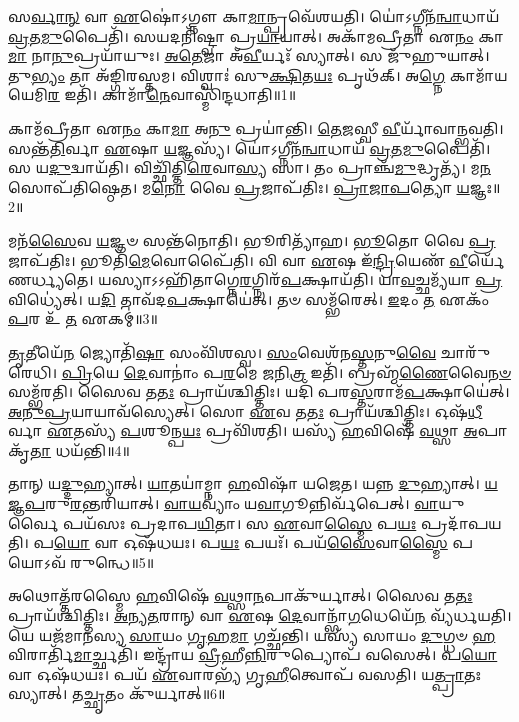 \setcounter{anuvakam}{0}

𑌸\-\ul{𑌰𑍍𑌵𑌾}\-\-\ul{𑌨𑍍} 𑌵𑌾 \ul{𑌏}\-𑌷𑍋॑\-𑌽𑌗𑍍𑌨𑍗 𑌕𑌾\-\ul{𑌮𑌾}\-𑌨𑍍𑌪𑍍𑌰𑌵𑍇᳴𑌶𑌯𑌤𑌿।
𑌯𑍋॑𑌽𑌗𑍍𑌨𑍀𑌨᳴\-\ul{𑌨𑍍𑌵𑌾}\-𑌧𑌾𑌯᳴ \ul{𑌵𑍍𑌰}\-𑌤\-\ul{𑌮𑍁}\-𑌪𑍈𑌤𑌿᳴।
𑌸𑌯𑌦𑌨𑌿᳴𑌷𑍍𑌟𑍍𑌵𑌾 𑌪𑍍𑌰\-\ul{𑌯𑌾}\-𑌯𑌾𑌤𑍍।
𑌅𑌕𑌾᳴𑌮𑌪𑍍𑌰𑍀𑌤𑌾 𑌏\-\ul{𑌨𑌂} 𑌕𑌾\-\ul{𑌮𑌾} 𑌨𑌾\-\ul{𑌨𑍁}\-𑌪𑍍𑌰𑌯𑌾᳴𑌯𑍁𑌃।
\-\ul{𑌅}\-\-\ul{𑌤𑍇}\-𑌜𑌾 𑌅᳴\-\ul{𑌵𑍀}\-𑌰𑍍𑌯𑌃᳴ 𑌸𑍍𑌯𑌾𑌤𑍍।
𑌸 𑌜𑍁᳴𑌹𑍁𑌯𑌾𑌤𑍍।
𑌤𑍁\-\ul{𑌭𑍍𑌯𑌂} 𑌤𑌾 𑌅᳴𑌙𑍍𑌗𑌿𑌰𑌸𑍍𑌤𑌮।
𑌵𑌿𑌶𑍍𑌵𑌾𑌃॑ 𑌸𑍁\-\ul{𑌕𑍍𑌷𑌿}\-𑌤\-\ul{𑌯𑌃} 𑌪𑍃𑌥᳴𑌕𑍍।
𑌅\-\ul{𑌗𑍍𑌨𑍇} 𑌕𑌾𑌮𑌾᳴𑌯 𑌯𑍇𑌮𑌿\-\ul{𑌰} 𑌇𑌤𑌿᳴।
𑌕𑌾𑌮𑌾᳴\-\ul{𑌨𑍇}\-𑌵𑌾𑌸𑍍𑌮𑌿᳴𑌨𑍍𑌦𑌧𑌾𑌤𑌿॥1॥

𑌕𑌾𑌮᳴𑌪𑍍𑌰𑍀𑌤𑌾 𑌏\-\ul{𑌨𑌂} 𑌕𑌾\-\ul{𑌮𑌾} 𑌅\-\ul{𑌨𑍁} 𑌪𑍍𑌰𑌯𑌾॑𑌨𑍍𑌤𑌿।
\-\ul{𑌤𑍇}\-\-\ul{𑌜}\-𑌸𑍍𑌵𑍀 \ul{𑌵𑍀}\-𑌰𑍍𑌯𑌾᳴𑌵𑌾𑌨𑍍𑌭𑌵𑌤𑌿।
𑌸𑌨𑍍𑌤᳴\-\ul{𑌤𑌿}\-𑌰𑍍𑌵𑌾 \ul{𑌏}\-𑌷𑌾 \ul{𑌯}\-𑌜𑍍𑌞𑌸𑍍𑌯᳴।
𑌯𑍋॑𑌽𑌗𑍍𑌨𑍀𑌨᳴\-\ul{𑌨𑍍𑌵𑌾}\-𑌧𑌾𑌯᳴ \ul{𑌵𑍍𑌰}\-𑌤\-\ul{𑌮𑍁}\-𑌪𑍈𑌤𑌿᳴।
𑌸 𑌯\-\ul{𑌦𑍁}\-𑌦𑍍𑌵𑌾𑌯᳴𑌤𑌿।
𑌵𑌿𑌚𑍍𑌛𑌿᳴𑌤𑍍𑌤𑌿\-\ul{𑌰𑍇}\-𑌵𑌾\-\ul{𑌸𑍍𑌯} 𑌸𑌾।
𑌤𑌂 𑌪𑍍𑌰𑌾𑌞𑍍𑌚᳴\-\ul{𑌮𑍁}\-𑌦𑍍𑌧𑍃𑌤𑍍𑌯᳴।
𑌮\-\ul{𑌨}\-𑌸𑍋𑌪᳴𑌤𑌿𑌷𑍍𑌠𑍇𑌤।
𑌮\-\ul{𑌨𑍋} 𑌵𑍈 \ul{𑌪𑍍𑌰}\-𑌜𑌾\-𑌪᳴𑌤𑌿𑌃।
\-\ul{𑌪𑍍𑌰𑌾}\-\-\ul{𑌜𑌾}\-\-\ul{𑌪}\-𑌤𑍍𑌯𑍋 \ul{𑌯}\-𑌜𑍍𑌞𑌃॥2॥

𑌮𑌨᳴\-\ul{𑌸𑍈}\-𑌵 \ul{𑌯}\-𑌜𑍍𑌞𑍞 𑌸𑌨𑍍𑌤᳴𑌨𑍋𑌤𑌿।
𑌭𑍂𑌰𑌿𑌤𑍍𑌯𑌾᳴𑌹।
\-\ul{𑌭𑍂}\-𑌤𑍋 𑌵𑍈 \ul{𑌪𑍍𑌰}\-𑌜𑌾\-𑌪᳴𑌤𑌿𑌃।
𑌭𑍂𑌤𑌿᳴\-\ul{𑌮𑍇}\-𑌵𑍋𑌪𑍈᳴𑌤𑌿।
𑌵𑌿 𑌵𑌾 \ul{𑌏}\-𑌷 𑌇᳴\-\ul{𑌨𑍍𑌦𑍍𑌰𑌿}\-𑌯𑍇𑌣᳴ \ul{𑌵𑍀}\-𑌰𑍍𑌯𑍇᳴𑌣𑌰𑍍𑌧𑍍𑌯𑌤𑍇।
𑌯𑌸𑍍𑌯𑌾𑌽𑌽𑌹𑌿᳴𑌤𑌾𑌗𑍍𑌨𑍇\-\ul{𑌰}\-𑌗𑍍𑌨𑌿𑌰᳴\-\ul{𑌪}\-𑌕𑍍𑌷𑌾𑌯᳴𑌤𑌿।
𑌯𑌾\-\ul{𑌵}\-𑌚𑍍𑌛𑌮𑍍𑌯᳴𑌯𑌾 \ul{𑌪𑍍𑌰}\-𑌵𑌿𑌧𑍍𑌯𑍇॑𑌤𑍍।
𑌯\-\ul{𑌦𑌿} 𑌤𑌾𑌵᳴𑌦\-\ul{𑌪}\-𑌕𑍍𑌷𑌾𑌯𑍇॑𑌤𑍍।
𑌤𑍞 𑌸𑌮𑍍𑌭᳴𑌰𑍇𑌤𑍍।
\-\ul{𑌇}\-𑌦𑌂 \ul{𑌤} 𑌏𑌕𑌂᳴ \ul{𑌪}\-𑌰 𑌉᳴ \ul{𑌤} 𑌏𑌕𑌮𑍍॑॥3॥

\-\ul{𑌤𑍃}\-𑌤𑍀𑌯𑍇᳴\-\ul{𑌨} 𑌜𑍍𑌯𑍋𑌤𑌿᳴\-\ul{𑌷𑌾} 𑌸𑌂𑌵𑌿᳴𑌶𑌸𑍍𑌵।
\-\ul{𑌸𑌂}\-𑌵𑍇𑌶᳴𑌨\-\ul{𑌸𑍍𑌤}\-𑌨𑍁\-\ul{𑌵𑍈} 𑌚𑌾𑌰𑍁᳴𑌰𑍇𑌧𑌿।
\-\ul{𑌪𑍍𑌰𑌿}\-𑌯𑍇 \ul{𑌦𑍇}\-𑌵𑌾𑌨𑌾𑌂॑ 𑌪\-\ul{𑌰}\-𑌮𑍇 \ul{𑌜}\-𑌨𑌿\-\ul{𑌤𑍍𑌰} 𑌇𑌤𑌿᳴।
𑌬𑍍𑌰𑌹𑍍𑌮᳴\-\ul{𑌣𑍈}\-𑌵𑍈\-\ul{𑌨}\-\-\ul{𑍞} 𑌸𑌮𑍍𑌭᳴𑌰𑌤𑌿।
𑌸𑍈𑌵 𑌤\-\ul{𑌤𑌃} 𑌪𑍍𑌰𑌾𑌯᳴𑌶𑍍𑌚𑌿𑌤𑍍𑌤𑌿𑌃।
𑌯𑌦𑌿᳴ 𑌪𑌰\-\ul{𑌸𑍍𑌤}\-𑌰𑌾𑌮᳴\-\ul{𑌪}\-𑌕𑍍𑌷𑌾𑌯𑍇॑𑌤𑍍।
\-\ul{𑌅}\-\-\ul{𑌨𑍁}\-\-\ul{𑌪𑍍𑌰}\-𑌯𑌾𑌯𑌾𑌵᳴𑌸𑍍𑌯𑍇𑌤𑍍।
𑌸𑍋 \ul{𑌏}\-𑌵 𑌤\-\ul{𑌤𑌃} 𑌪𑍍𑌰𑌾𑌯᳴𑌶𑍍𑌚𑌿𑌤𑍍𑌤𑌿𑌃।
𑌓𑌷᳴\-\ul{𑌧𑍀}\-𑌰𑍍𑌵𑌾 \ul{𑌏}\-𑌤𑌸𑍍𑌯᳴ \ul{𑌪}\-𑌶𑍂𑌨𑍍𑌪\-\ul{𑌯𑌃} 𑌪𑍍𑌰𑌵𑌿᳴𑌶𑌤𑌿।
𑌯𑌸𑍍𑌯᳴ \ul{𑌹}\-𑌵𑌿𑌷𑍇᳴ \ul{𑌵}\-𑌥𑍍𑌸𑌾 \ul{𑌅}\-𑌪𑌾𑌕𑍃᳴\-\ul{𑌤𑌾} 𑌧𑌯᳴𑌨𑍍𑌤𑌿॥4॥

𑌤𑌾𑌨𑍍 𑌯\-\ul{𑌦𑍍𑌦𑍁}\-𑌹𑍍𑌯𑌾𑌤𑍍।
\-\ul{𑌯𑌾}\-𑌤𑌯𑌾॑𑌮𑍍𑌨𑌾 \ul{𑌹}\-𑌵𑌿𑌷𑌾᳴ 𑌯𑌜𑍇𑌤।
𑌯𑌨𑍍𑌨 \ul{𑌦𑍁}\-𑌹𑍍𑌯𑌾𑌤𑍍।
\-\ul{𑌯}\-\-\ul{𑌜𑍍𑌞}\-\-\ul{𑌪}\-𑌰𑍁\-\ul{𑌰}\-𑌨𑍍𑌤𑌰𑌿᳴𑌯𑌾𑌤𑍍।
\-\ul{𑌵𑌾}\-\-\ul{𑌯}\-𑌵𑍍𑌯𑌾𑌂॑ 𑌯\-\ul{𑌵𑌾}\-𑌗𑍂𑌨𑍍𑌨𑌿𑌰𑍍𑌵᳴𑌪𑍇𑌤𑍍।
\-\ul{𑌵𑌾}\-𑌯𑍁𑌰𑍍𑌵𑍈 𑌪𑌯᳴𑌸𑌃 𑌪𑍍𑌰𑌦𑌾𑌪\-\ul{𑌯𑌿}\-𑌤𑌾।
𑌸 \ul{𑌏}\-𑌵𑌾\-\ul{𑌸𑍍𑌮𑍈} 𑌪\-\ul{𑌯𑌃} 𑌪𑍍𑌰𑌦𑌾᳴𑌪𑌯𑌤𑌿।
𑌪\-\ul{𑌯𑍋} 𑌵𑌾 𑌓𑌷᳴𑌧𑌯𑌃।
𑌪\-\ul{𑌯𑌃} 𑌪𑌯𑌃᳴।
𑌪𑌯᳴\-\ul{𑌸𑍈}\-𑌵𑌾\-\ul{𑌸𑍍𑌮𑍈} 𑌪𑌯𑍋\-𑌽𑌵᳴ 𑌰𑍁𑌨𑍍𑌧𑍇॥5॥

𑌅𑌥𑍋𑌤𑍍𑌤᳴𑌰𑌸𑍍𑌮𑍈 \ul{𑌹}\-𑌵𑌿𑌷𑍇᳴ \ul{𑌵}\-𑌥𑍍𑌸𑌾\-\ul{𑌨}\-𑌪𑌾𑌕𑍁᳴𑌰𑍍𑌯𑌾𑌤𑍍।
𑌸𑍈𑌵 𑌤\-\ul{𑌤𑌃} 𑌪𑍍𑌰𑌾𑌯᳴𑌶𑍍𑌚𑌿𑌤𑍍𑌤𑌿𑌃।
\-\ul{𑌅}\-\-\ul{𑌨𑍍𑌯}\-\-\ul{𑌤}\-𑌰𑌾𑌨𑍍 𑌵𑌾 \ul{𑌏}\-𑌷 \ul{𑌦𑍇}\-𑌵𑌾𑌨𑍍𑌭𑌾᳴\-\ul{𑌗}\-𑌧𑍇𑌯𑍇᳴\-\ul{𑌨} 𑌵𑍍𑌯᳴𑌰𑍍𑌧𑌯𑌤𑌿।
𑌯𑍇 𑌯𑌜᳴𑌮𑌾𑌨𑌸𑍍𑌯 \ul{𑌸𑌾}\-𑌯𑌂 \ul{𑌗𑍃}\-𑌹\-\ul{𑌮𑌾} 𑌗𑌚𑍍𑌛᳴𑌨𑍍𑌤𑌿।
𑌯𑌸𑍍𑌯᳴ 𑌸𑌾𑌯𑌂 \ul{𑌦𑍁}\-𑌗𑍍𑌧𑍞 \ul{𑌹}\-𑌵𑌿𑌰𑌾𑌰𑍍𑌤𑌿᳴\-\ul{𑌮𑌾}\-𑌰𑍍𑌚𑍍𑌛𑌤𑌿᳴।
𑌇𑌨𑍍𑌦𑍍𑌰𑌾᳴𑌯 \ul{𑌵𑍍𑌰𑍀}\-𑌹𑍀\-\ul{𑌨𑍍𑌨𑌿}\-𑌰𑍁𑌪𑍍𑌯𑍋𑌪᳴ 𑌵𑌸𑍇𑌤𑍍।
𑌪\-\ul{𑌯𑍋} 𑌵𑌾 𑌓𑌷᳴𑌧𑌯𑌃।
𑌪𑌯᳴ \ul{𑌏}\-𑌵𑌾𑌰𑌭𑍍𑌯᳴ 𑌗𑍃\-\ul{𑌹𑍀}\-𑌤𑍍𑌵𑍋𑌪᳴ 𑌵𑌸𑌤𑌿।
𑌯\-\ul{𑌤𑍍𑌪𑍍𑌰𑌾}\-𑌤𑌃 𑌸𑍍𑌯𑌾𑌤𑍍।
𑌤\-\ul{𑌚𑍍𑌛𑍃}\-𑌤𑌂 𑌕𑍁᳴𑌰𑍍𑌯𑌾𑌤𑍍॥6॥


